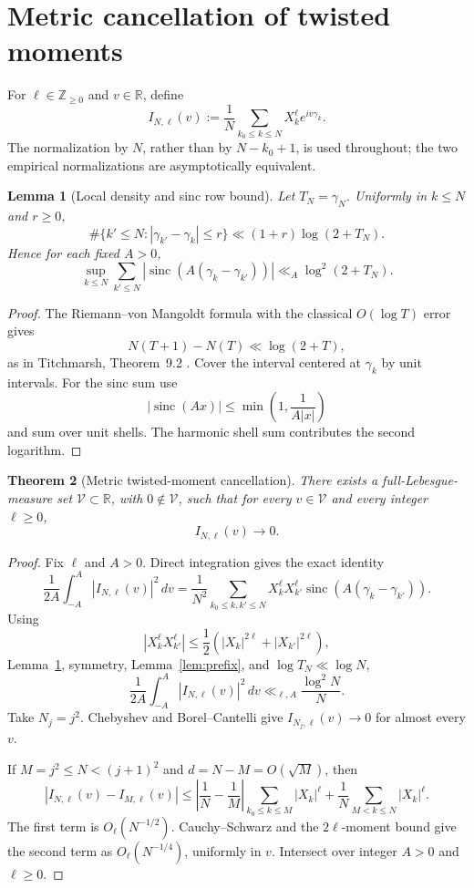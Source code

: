 \documentclass[pdflatex,sn-mathphys-num]{sn-jnl}
\numberwithin{equation}{section}
\theoremstyle{thmstyleone}
\newtheorem{theorem}{Theorem}[section]
\newtheorem{lemma}[theorem]{Lemma}
\theoremstyle{thmstylethree}
\theoremstyle{thmstyletwo}
\newcommand{\R}{\mathbb R}
\newcommand{\Z}{\mathbb Z}
\newcommand{\sinc}{\operatorname{sinc}}
\newcommand{\1}{\mathbf 1}
\begin{document}
\section{Metric cancellation of twisted moments}

For $\ell\in\Z_{\ge0}$ and $v\in\R$, define
\[
 I_{N,\ell}(v):=\frac1N\sum_{k_0\le k\le N}X_k^\ell e^{iv\gamma_k}.
\]
The normalization by \(N\), rather than by \(N-k_0+1\), is used throughout;
the two empirical normalizations are asymptotically equivalent.

\begin{lemma}[Local density and sinc row bound]
\label{lem:density}
Let $T_N=\gamma_N$.  Uniformly in $k\le N$ and $r\ge0$,
\[
 \#\{k'\le N:|\gamma_{k'}-\gamma_k|\le r\}
 \ll (1+r)\log(2+T_N).
\]
Hence for each fixed $A>0$,
\[
 \sup_{k\le N}\sum_{k'\le N}
 \left|\sinc\!\left(A(\gamma_k-\gamma_{k'})\right)\right|
 \ll_A\log^2(2+T_N).
\]
\end{lemma}

\begin{proof}
The Riemann--von Mangoldt formula with the classical $O(\log T)$ error gives
\[
 N(T+1)-N(T)\ll\log(2+T),
\]
as in Titchmarsh, Theorem~9.2 \cite{Titchmarsh1986}.
Cover the interval centered at $\gamma_k$ by unit intervals.  For the sinc sum use
\[
 |\sinc(Ax)|\le \min\!\left(1,\frac1{A|x|}\right)
\]
and sum over unit shells.  The harmonic shell sum contributes the second logarithm.
\end{proof}

\begin{theorem}[Metric twisted-moment cancellation]
\label{thm:metric}
There exists a full-Lebesgue-measure set $\mathcal V\subset\R$, with $0\notin\mathcal V$, such that for every $v\in\mathcal V$ and every integer $\ell\ge0$,
\[
 I_{N,\ell}(v)\longrightarrow0.
\]
\end{theorem}

\begin{proof}
Fix $\ell$ and $A>0$.  Direct integration gives the exact identity
\begin{equation}
 \frac1{2A}\int_{-A}^{A}|I_{N,\ell}(v)|^2\,dv
 =
 \frac1{N^2}
 \sum_{k_0\le k,k'\le N}
 X_k^\ell X_{k'}^\ell
 \sinc\!\left(A(\gamma_k-\gamma_{k'})\right).
\label{eq:sinc}
\end{equation}
Using
\[
 |X_k^\ell X_{k'}^\ell|
 \le \frac12\left(|X_k|^{2\ell}+|X_{k'}|^{2\ell}\right),
\]
Lemma~\ref{lem:density}, symmetry, Lemma~\ref{lem:prefix}, and $\log T_N\ll\log N$,
\[
 \frac1{2A}\int_{-A}^{A}|I_{N,\ell}(v)|^2\,dv
 \ll_{\ell,A}\frac{\log^2N}{N}.
\]
Take $N_j=j^2$.  Chebyshev and Borel--Cantelli give $I_{N_j,\ell}(v)\to0$ for almost every $v$.

If $M=j^2\le N<(j+1)^2$ and $d=N-M=O(\sqrt M)$, then
\[
 |I_{N,\ell}(v)-I_{M,\ell}(v)|
 \le
 \left|\frac1N-\frac1M\right|\sum_{k_0\le k\le M}|X_k|^\ell
 +\frac1N\sum_{M<k\le N}|X_k|^\ell.
\]
The first term is $O_\ell(N^{-1/2})$.  Cauchy--Schwarz and the $2\ell$-moment bound give the second term as $O_\ell(N^{-1/4})$, uniformly in $v$.  Intersect over integer $A>0$ and $\ell\ge0$.
\end{proof}
\end{document}
